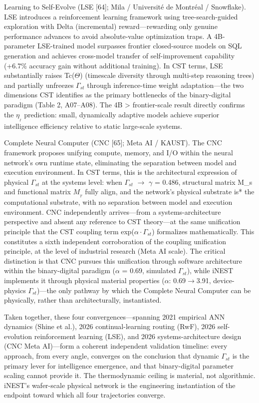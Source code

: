 \documentclass[a4paper,12pt]{article}
\begin{document}
Learning to Self-Evolve (LSE [64]; Mila / Universit\'{e} de Montr\'{e}al / Snowflake). LSE introduces a reinforcement learning framework using tree-search-guided exploration with Delta (incremental) reward---rewarding only genuine performance advances to avoid absolute-value optimization traps. A 4B-parameter LSE-trained model surpasses frontier closed-source models on SQL generation and achieves cross-model transfer of self-improvement capability (+6.7\% accuracy gain without additional training). In CST terms, LSE substantially raises Tc($\Theta$) (timescale diversity through multi-step reasoning trees) and partially unfreezes $\Gamma_{st}$ through inference-time weight adaptation---the two dimensions CST identifies as the primary bottlenecks of the binary-digital paradigm (Table 2, A07--A08). The 4B > frontier-scale result directly confirms the $\eta_{_I}$ prediction: small, dynamically adaptive models achieve superior intelligence efficiency relative to static large-scale systems.


Complete Neural Computer (CNC [65]; Meta AI / KAUST). The CNC framework proposes unifying compute, memory, and I/O within the neural network's own runtime state, eliminating the separation between model and execution environment. In CST terms, this is the architectural expression of physical $\Gamma_{st}$ at the systems level: when $\Gamma_{st}$ $\rightarrow$ $\gamma$ = 0.486, structural matrix M_{s} and functional matrix $M_{_T}$ fully align, and the network's physical substrate is* the computational substrate, with no separation between model and execution environment. CNC independently arrives---from a systems-architecture perspective and absent any reference to CST theory---at the same unification principle that the CST coupling term exp($\alpha \cdot \Gamma_{st}$) formalizes mathematically. This constitutes a sixth independent corroboration of the coupling unification principle, at the level of industrial research (Meta AI scale). The critical distinction is that CNC pursues this unification through software architecture within the binary-digital paradigm ($\alpha$ = 0.69, simulated $\Gamma_{st}$), while iNEST implements it through physical material properties ($\alpha$: 0.69$\rightarrow$3.91, device-physics $\Gamma_{st}$)---the only pathway by which the Complete Neural Computer can be physically, rather than architecturally, instantiated.


Taken together, these four convergences---spanning 2021 empirical ANN dynamics (Shine et al.), 2026 continual-learning routing (RwF), 2026 self-evolution reinforcement learning (LSE), and 2026 systems-architecture design (CNC Meta AI)---form a coherent independent validation timeline: every approach, from every angle, converges on the conclusion that dynamic $\Gamma_{st}$ is the primary lever for intelligence emergence, and that binary-digital parameter scaling cannot provide it. The thermodynamic ceiling is material, not algorithmic. iNEST's wafer-scale physical network is the engineering instantiation of the endpoint toward which all four trajectories converge.
\end{document}
